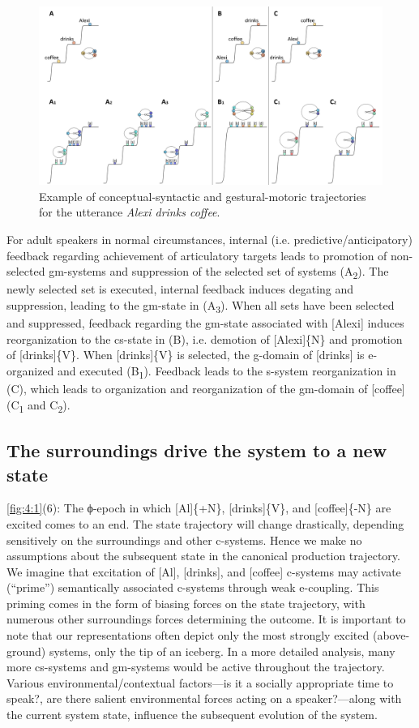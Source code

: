   
\begin{figure}
\includegraphics[width=\textwidth]{figures/Tilsen-img55.png}
\caption{Example of conceptual-syntactic and gestural-motoric trajectories for the utterance \textit{Alexi drinks coffee}.}
\label{fig:4:5}
\end{figure}
 

  For adult speakers in normal circumstances, internal (i.e. predictive/anticipatory) feedback regarding achievement of articulatory targets leads to promotion of non-selected gm-systems and suppression of the selected set of systems (A\textsubscript{2}). The newly selected set is executed, internal feedback induces degating and suppression, leading to the gm-state in (A\textsubscript{3}). When all sets have been selected and suppressed, feedback regarding the gm-state associated with [Alexi] induces reorganization to the cs-state in (B), i.e. demotion of [Alexi]\{N\} and promotion of [drinks]\{V\}. When [drinks]\{V\} is selected, the g-domain of [drinks] is e-organized and executed (B\textsubscript{1}). Feedback leads to the s-system reorganization in (C), which leads to organization and reorganization of the gm-domain of [coffee] (C\textsubscript{1} and C\textsubscript{2}).

\subsection{The surroundings drive the system to a new state}

\ref{fig:4:1}(6): The ϕ-epoch in which [Al]\{+N\}, [drinks]\{V\}, and [coffee]\{-N\} are excited comes to an end. The state trajectory will change drastically, depending sensitively on the surroundings and other c-systems. Hence we make no assumptions about the subsequent state in the canonical production trajectory. We imagine that excitation of [Al], [drinks], and [coffee] c-systems may activate (“prime”) semantically associated c-systems through weak e-coupling. This priming comes in the form of biasing forces on the state trajectory, with numerous other surroundings forces determining the outcome. It is important to note that our representations often depict only the most strongly excited (above-ground) systems, only the tip of an iceberg. In a more detailed analysis, many more cs-systems and gm-systems would be active throughout the trajectory. Various environmental/contextual factors—is it a socially appropriate time to speak?, are there salient environmental forces acting on a speaker?—along with the current system state, influence the subsequent evolution of the system. 

